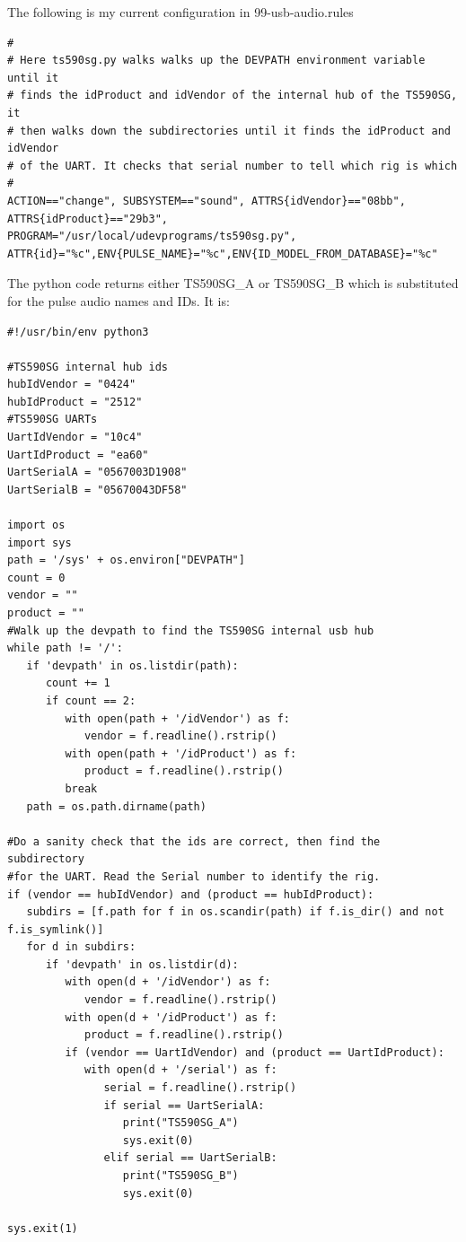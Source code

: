 \documentclass[12pt]{article}
\begin{document}
The following is my current configuration in 99-usb-audio.rules

\begin{verbatim}
#
# Here ts590sg.py walks walks up the DEVPATH environment variable until it
# finds the idProduct and idVendor of the internal hub of the TS590SG, it
# then walks down the subdirectories until it finds the idProduct and idVendor
# of the UART. It checks that serial number to tell which rig is which
#
ACTION=="change", SUBSYSTEM=="sound", ATTRS{idVendor}=="08bb",
ATTRS{idProduct}=="29b3", PROGRAM="/usr/local/udevprograms/ts590sg.py",
ATTR{id}="%c",ENV{PULSE_NAME}="%c",ENV{ID_MODEL_FROM_DATABASE}="%c"
\end{verbatim}

The python code returns either TS590SG\_A or TS590SG\_B which is substituted
for the pulse audio names and IDs. It is:

\begin{verbatim}
#!/usr/bin/env python3

#TS590SG internal hub ids
hubIdVendor = "0424"
hubIdProduct = "2512"
#TS590SG UARTs
UartIdVendor = "10c4"
UartIdProduct = "ea60"
UartSerialA = "0567003D1908"
UartSerialB = "05670043DF58"

import os
import sys
path = '/sys' + os.environ["DEVPATH"]
count = 0
vendor = ""
product = ""
#Walk up the devpath to find the TS590SG internal usb hub
while path != '/':
   if 'devpath' in os.listdir(path):
      count += 1
      if count == 2:
         with open(path + '/idVendor') as f:
            vendor = f.readline().rstrip()
         with open(path + '/idProduct') as f:
            product = f.readline().rstrip()
         break
   path = os.path.dirname(path)

#Do a sanity check that the ids are correct, then find the subdirectory
#for the UART. Read the Serial number to identify the rig.
if (vendor == hubIdVendor) and (product == hubIdProduct):
   subdirs = [f.path for f in os.scandir(path) if f.is_dir() and not f.is_symlink()]
   for d in subdirs:
      if 'devpath' in os.listdir(d):
         with open(d + '/idVendor') as f:
            vendor = f.readline().rstrip()
         with open(d + '/idProduct') as f:
            product = f.readline().rstrip()
         if (vendor == UartIdVendor) and (product == UartIdProduct):
            with open(d + '/serial') as f:
               serial = f.readline().rstrip()
               if serial == UartSerialA:
                  print("TS590SG_A")
                  sys.exit(0)
               elif serial == UartSerialB:
                  print("TS590SG_B")
                  sys.exit(0)

sys.exit(1)
\end{verbatim}
\end{document}
